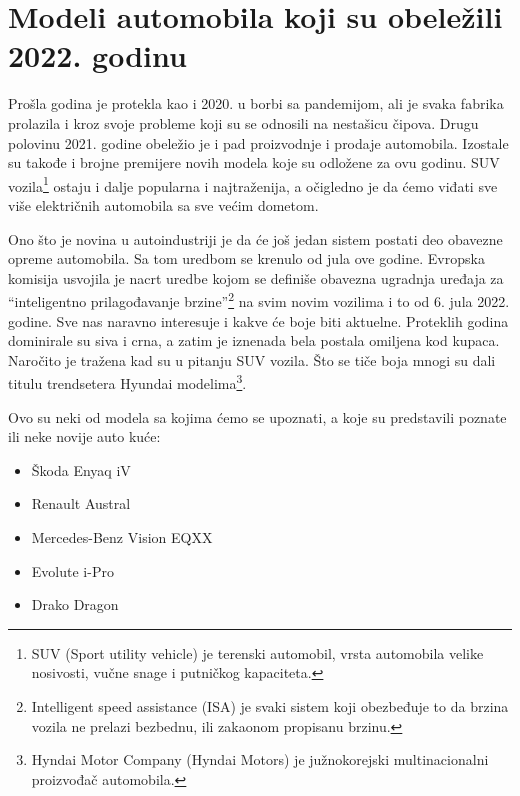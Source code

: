 \documentclass[a4paper]{article}
\begin{document}
\section{Modeli automobila koji su obeležili 2022. godinu\vspace{2ex}}
\label{sec:MODELI AUTOMOBILA KOJI SU OBELEŽILI 2022. GODINU}

   Prošla godina je protekla kao i 2020. u borbi sa pandemijom, ali je svaka fabrika prolazila i kroz svoje probleme koji su se odnosili na nestašicu čipova. Drugu polovinu 2021. godine obeležio je i pad proizvodnje i prodaje automobila. Izostale su takođe i brojne premijere novih modela koje su odložene za ovu godinu. SUV vozila\footnote{SUV (Sport utility vehicle) je terenski automobil, vrsta automobila velike nosivosti, vučne snage i putničkog kapaciteta.} ostaju i dalje popularna i najtraženija, a očigledno je da ćemo viđati sve više električnih automobila sa sve većim dometom.

    Ono što je novina u autoindustriji je da će još jedan sistem postati deo obavezne opreme automobila. Sa tom uredbom se krenulo od jula ove godine. Evropska komisija usvojila je nacrt uredbe kojom se definiše obavezna ugradnja uređaja za “inteligentno prilagođavanje brzine”\footnote{Intelligent speed assistance (ISA) je svaki sistem koji obezbeđuje to da brzina vozila ne prelazi bezbednu, ili zakaonom propisanu brzinu.} na svim novim vozilima i to od 6. jula 2022. godine. Sve nas naravno interesuje i kakve će boje biti aktuelne. Proteklih godina dominirale su siva i crna, a zatim je iznenada bela postala omiljena kod kupaca. Naročito je tražena kad su u pitanju SUV vozila. Što se tiče boja mnogi su dali titulu  trendsetera Hyundai modelima\footnote{Hyndai Motor Company (Hyndai Motors) je južnokorejski multinacionalni proizvođač automobila.}.

    Ovo su neki od modela sa kojima ćemo se upoznati, a koje su predstavili poznate ili neke novije auto kuće:\\
    \begin{itemize}
     \item Škoda Enyaq iV 
     \item Renault Austral   
     \item Mercedes-Benz Vision EQXX 
     \item Evolute i-Pro 
     \item Drako Dragon\\ 
    \end{itemize}
    
\end{document}

